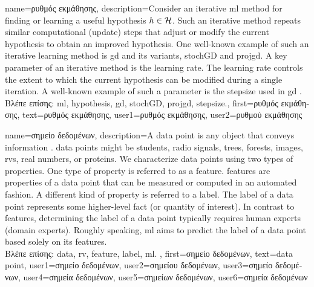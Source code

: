{name={\foreignlanguage{greek}{ρυθμός εκμάθησης}}, 
	description={Consider 
		an iterative \gls{ml} method for finding or learning a useful \gls{hypothesis} $h \in \mathcal{H}$. 
		Such an iterative method repeats similar computational (update) steps that adjust or 
		modify the current \gls{hypothesis} to obtain an improved \gls{hypothesis}. One 
		well-known example of such an iterative learning method is \gls{gd} and its variants, \gls{stochGD} and 
		\gls{projgd}. A key parameter of an iterative method is the learning rate. 
		The learning rate controls the extent to which the current \gls{hypothesis} 
		can be modified during a single iteration. A well-known example of such a parameter 
		is the \gls{stepsize} used in \gls{gd} \cite[Ch. 5]{MLBasics}.\\
		\foreignlanguage{greek}{Βλέπε επίσης:} \gls{ml}, \gls{hypothesis}, \gls{gd}, \gls{stochGD}, \gls{projgd}, \gls{stepsize}.},
	first={\foreignlanguage{greek}{ρυθμός εκμάθησης}},
	text={\foreignlanguage{greek}{ρυθμός εκμάθησης}},
	user1={\foreignlanguage{greek}{ρυθμός εκμάθησης}}, %
  	user2={\foreignlanguage{greek}{ρυθμού εκμάθησης}} %
}

{name={\foreignlanguage{greek}{σημείο δεδομένων}},
	description={A \gls{data} point is any object that conveys information \cite{coverthomas}. \Gls{data} points might be 
		students, radio signals, trees, forests, images, \gls{rv}s, real numbers, or proteins. We characterize \gls{data} points 
		using two types of properties. One type of property is referred to as a \gls{feature}. \Gls{feature}s are properties of a 
		\gls{data} point that can be measured or computed in an automated fashion. 
		A different kind of property is referred to a \gls{label}. The \gls{label} of 
		a \gls{data} point represents some higher-level fact (or quantity of interest). In 
		contrast to \gls{feature}s, determining the \gls{label} of a \gls{data} point typically 
		requires human experts (domain experts). Roughly speaking, \gls{ml} aims to predict 
		the \gls{label} of a \gls{data} point based solely on its \gls{feature}s.\\
		\foreignlanguage{greek}{Βλέπε επίσης:} \gls{data}, \gls{rv}, \gls{feature}, \gls{label}, \gls{ml}.
		}, 
		first={\foreignlanguage{greek}{σημείο δεδομένων}},
		text={data point},
		user1={\foreignlanguage{greek}{σημείο δεδομένων}}, %
		user2={\foreignlanguage{greek}{σημείου δεδομένων}}, %
		user3={\foreignlanguage{greek}{σημείο δεδομένων}}, %
		user4={\foreignlanguage{greek}{σημεία δεδομένων}}, %
		user5={\foreignlanguage{greek}{σημείων δεδομένων}}, %
		user6={\foreignlanguage{greek}{σημεί\-α δεδομένων}} %
}

